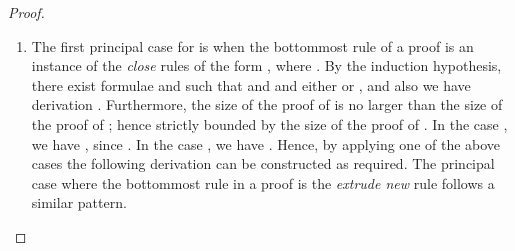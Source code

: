 \begin{proof}
\begin{enumerate}[label=\textbf{\Alph*},ref=\Alph*,leftmargin=*]
\begin{enumerate}[label*=\textbf{.\arabic*}]
\item The first principal case for  is when the bottommost rule of a proof is an instance of the \textit{close} rules of the form
,
where .
By the induction hypothesis, there exist formulae  and  such that  and  and either  or , and also we have derivation
.
Furthermore, the size of the proof of  is no larger than the size of the proof of ; hence strictly bounded by the size of the proof of .
In the case , we have , since .
In the case , we have
.
Hence, by applying one of the above cases the following derivation
 can be constructed as required.
The principal case where the bottommost rule in a proof is the \textit{extrude new} rule follows a similar pattern.
\begin{comment}
There are four principal cases for .
This first is when the bottommost rule of a proof is
,
where  and . Observe that the proof of  has proof one step shorter than  and,
by Lemma~\ref{lemma:bound}, 
thereby strictly bounding the size of the proof.
N.B.\ this argument is used implicitly in every case for splitting.

By induction, there exist formulae  and  and  and  and either  or , for , and -ary killing context such that the following holds.
.
Furthermore, the size of the proof of  is no larger than the size of the proof of ; hence strictly bounded by the size of the proof of .

In the case that , the following derivation can be constructed, since ,
.

In the case that , we have derivation 
.

Hence, by applying one of the above cases for each , the following derivation can be constructed as required.

\end{comment}


\begin{comment}
The second principal case for \textit{new} is when the bottommost rule of a proof begins as follows, where .


\end{comment}
\end{enumerate}
\end{enumerate}
\end{proof}
